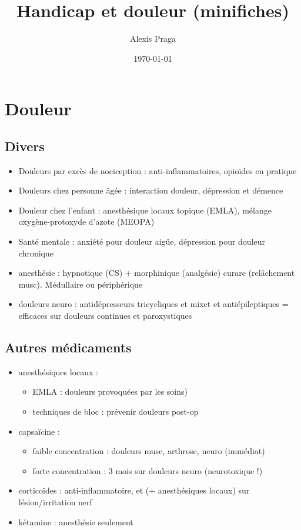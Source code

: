 \documentclass[11pt]{article}
\author{Alexis Praga}
\date{\today}
\title{Handicap et douleur (minifiches)}
\begin{document}
\maketitle
\tableofcontents



\section{Douleur}
\label{sec:orgc3e2804}
\subsection{Divers}
\label{sec:org377567d}
\begin{itemize}
\item Douleurs par excès de nociception : anti-inflammatoires, opioïdes en pratique
\item Douleurs chez personne âgée : interaction douleur, dépression et démence
\item Douleur chez l'enfant : anesthésique locaux topique (EMLA), mélange
oxygène-protoxyde d'azote (MEOPA)
\item Santé mentale : anxiété pour douleur aigüe, dépression pour douleur chronique
\item anesthésie : hypnotique (CS) + morphinique (analgésie) \textpm{} curare (relâchement
musc). Médullaire ou périphérique
\item douleurs neuro : antidépresseurs tricycliques et mixet et antiépileptiques =
efficaces sur douleurs continues et paroxystiques
\end{itemize}

\subsection{Autres médicaments}
\label{sec:org475373b}
\begin{itemize}
\item anesthésiques locaux : 
\begin{itemize}
\item EMLA : douleurs provoquées par les soins)
\item techniques de bloc : prévenir douleurs post-op
\end{itemize}
\item capsaïcine : 
\begin{itemize}
\item faible concentration : douleurs musc, arthrose, neuro (immédiat)
\item forte concentration : 3 mois sur douleurs neuro (neurotoxique !)
\end{itemize}
\item corticoïdes : anti-inflammatoire, et (+ anesthésiques locaux) sur
lésion/irritation nerf
\item kétamine : anesthésie seulement
\end{itemize}
\end{document}
